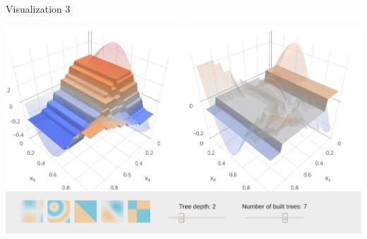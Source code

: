 \begin{vbframe}{Visualization 3}
\begin{center}
\includegraphics[width=\textwidth]{figure_man/gbm_anim/gbm7.jpg}
\href{http://arogozhnikov.github.io/2016/06/24/gradient_boosting_explained.html}{}
\end{center}
\addtocounter{framenumber}{-1}
\end{vbframe}



